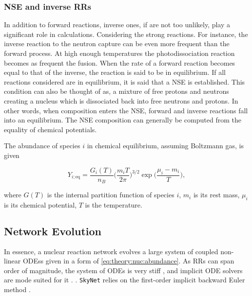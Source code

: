 \subsubsection{\ac{NSE} and inverse \acp{RR}}


In addition to forward reactions, inverse ones, if are not too unlikely, play a significant role in \nuc{} calculations. Considering the strong reactions. For instance, the inverse reaction to the neutron capture can be even more frequent than the forward process. At high enough temperatures the photodissociation reaction becomes as frequent the fusion. 
When the rate of a forward reaction becomes equal to that of the inverse, the reaction is said to be in equilibrium. 
If all reactions considered are in equilibrium, it is said that a \ac{NSE} is established. This condition can also be thought of as, a mixture of free protons and neutrons creating a nucleus which is dissociated back into free neutrons and protons. In other words, when composition enters the \ac{NSE}, forward and inverse reactions fall into an equilibrium. The \ac{NSE} composition can generally be computed from the equality of chemical potentials. 

The abundance of species $i$ in chemical equilibrium, assuming Boltzmann gas, is given 

\begin{equation}
Y_{i;\text{eq}} = \frac{G_i(T)}{n_B}\Bigg(\frac{m_i T}{2\pi}\Bigg)^{3/2}\exp\Bigg(\frac{\mu_i - m_i}{T}\Bigg),
\end{equation}

where $G(T)$ is the internal partition function of species $i$, $m_i$ is its rest mass, $\mu_i$ is its chemical potential, $T$ is the temperature.


\subsection{Network Evolution}
In essence, a nuclear reaction network evolves a large system of coupled non-linear \acp{ODEs} given in a form of \eqref{eq:theory:nuc:abundance}. As \acp{RR} can span order of magnitude, the system of \acp{ODE} is very stiff \cite{Timmes:1999,Hix:2005pf}, and implicit \ac{ODE} solvers are mode suited for it \cite{Timmes:1999,Winteler:2012,Longland:2014}. . 
\texttt{SkyNet} relies on the first-order implicit backward Euler method \cite{Hix:1999}. 

